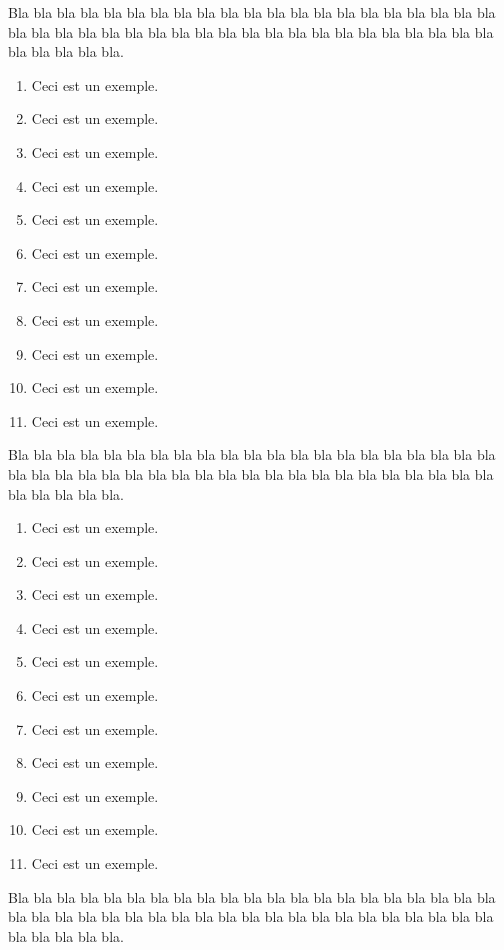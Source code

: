 \documentclass{article}
\makeatletter
\newcommand{\nouveaumakelabel}[1]{ %
			\rlap{\enit@format#1}\hss %
		}
\makeatother
\begin{document}
	Bla bla bla bla bla bla bla bla bla bla bla bla bla bla bla bla bla bla bla bla bla bla bla bla bla bla bla bla bla bla bla bla bla bla bla bla bla bla bla bla bla bla bla bla bla bla bla.

	\begin{enumerate}[label=(\arabic*)]
		\item Ceci est un exemple.
		\item Ceci est un exemple.
		\item Ceci est un exemple.
		\item Ceci est un exemple.
		\item Ceci est un exemple.
		\item Ceci est un exemple.
		\item Ceci est un exemple.
		\item Ceci est un exemple.
		\item Ceci est un exemple.
		\item Ceci est un exemple.
		\item Ceci est un exemple.
	\end{enumerate}

	Bla bla bla bla bla bla bla bla bla bla bla bla bla bla bla bla bla bla bla bla bla bla bla bla bla bla bla bla bla bla bla bla bla bla bla bla bla bla bla bla bla bla bla bla bla bla bla.
	
	\begin{enumerate}[
		before=\renewcommand{\makelabel}{\nouveaumakelabel},
		label=(\arabic*)
	]
		\item Ceci est un exemple.
		\item Ceci est un exemple.
		\item Ceci est un exemple.
		\item Ceci est un exemple.
		\item Ceci est un exemple.
		\item Ceci est un exemple.
		\item Ceci est un exemple.
		\item Ceci est un exemple.
		\item Ceci est un exemple.
		\item Ceci est un exemple.
		\item Ceci est un exemple.
	\end{enumerate}

	Bla bla bla bla bla bla bla bla bla bla bla bla bla bla bla bla bla bla bla bla bla bla bla bla bla bla bla bla bla bla bla bla bla bla bla bla bla bla bla bla bla bla bla bla bla bla bla.
\end{document}
